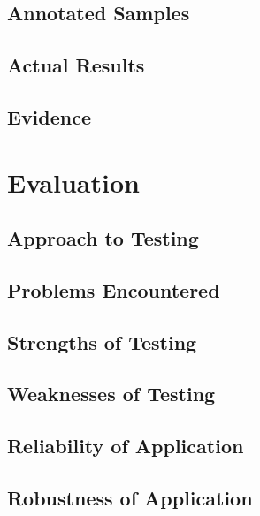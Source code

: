 \begin{landscape}
\section{Annotated Samples}

\subsection{Actual Results}

\subsection{Evidence}

\end{landscape}

\section{Evaluation}

\subsection{Approach to Testing}

\subsection{Problems Encountered}

\subsection{Strengths of Testing}

\subsection{Weaknesses of Testing}

\subsection{Reliability of Application}

\subsection{Robustness of Application}

